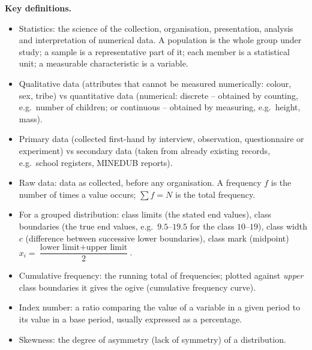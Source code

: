 \documentclass[11pt]{article}
\newcommand{\cle}[1]{{\popxbold\color{popdark}#1}}
\begin{document}
\begin{bilan}
\textbf{Key definitions.}
\begin{itemize}
\item \cle{Statistics}: the science of the collection, organisation, presentation, analysis and interpretation of numerical data. A \cle{population} is the whole group under study; a \cle{sample} is a representative part of it; each member is a \cle{statistical unit}; a measurable characteristic is a \cle{variable}.
\item \cle{Qualitative data} (attributes that cannot be measured numerically: colour, sex, tribe) vs \cle{quantitative data} (numerical: \cle{discrete} -- obtained by counting, e.g.\ number of children; or \cle{continuous} -- obtained by measuring, e.g.\ height, mass).
\item \cle{Primary data} (collected first-hand by interview, observation, questionnaire or experiment) vs \cle{secondary data} (taken from already existing records, e.g.\ school registers, MINEDUB reports).
\item \cle{Raw data}: data as collected, before any organisation. A \cle{frequency} $f$ is the number of times a value occurs; $\sum f = N$ is the total frequency.
\item For a grouped distribution: \cle{class limits} (the stated end values), \cle{class boundaries} (the true end values, e.g.\ $9.5$--$19.5$ for the class $10$--$19$), \cle{class width} $c$ (difference between successive lower boundaries), \cle{class mark} (midpoint) $x_i=\dfrac{\text{lower limit}+\text{upper limit}}{2}$.
\item \cle{Cumulative frequency}: the running total of frequencies; plotted against \emph{upper} class boundaries it gives the \cle{ogive} (cumulative frequency curve).
\item \cle{Index number}: a ratio comparing the value of a variable in a given period to its value in a \cle{base period}, usually expressed as a percentage.
\item \cle{Skewness}: the degree of asymmetry (lack of symmetry) of a distribution.
\end{itemize}


\end{bilan}
\end{document}
